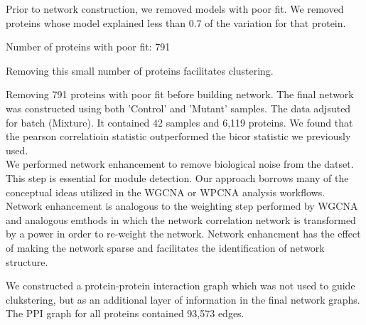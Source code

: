 \documentclass[11pt]{elife}\usepackage[]{graphicx}\usepackage[]{color}
\begin{document}
Prior to network construction, we removed models with poor fit. We removed
proteins whose model explained less than 0.7 of the variation for that protein. 


Number of proteins with poor fit: 791

Removing this small number of proteins facilitates clustering.


Removing 791 proteins with poor fit before building network. 
The final network was constructed using both 'Control' and 'Mutant' samples. The
data adjsuted for batch (Mixture). It contained 42 samples and 6,119 proteins.
We found that the pearson correlatioin statistic outperformed the bicor
statistic we previously used. \\

%


We performed network enhancement to remove biological noise from the datset.
This step is essential for module detection. Our approach borrows many of the
conceptual ideas utilized in the WGCNA or WPCNA analysis workflows. Network
enhancement is analogous to the weighting step performed by WGCNA and analogous
emthods in which the network correlation network is transformed by a power in
order to re-weight the network. Network enhancment has the effect of making the
network sparse and facilitates the identification of network structure.

We constructed a protein-protein interaction graph which was not used to guide
clukstering, but as an additional layer of information in the final network
graphs. The PPI graph for all proteins contained 93,573 edges.
\end{document}
